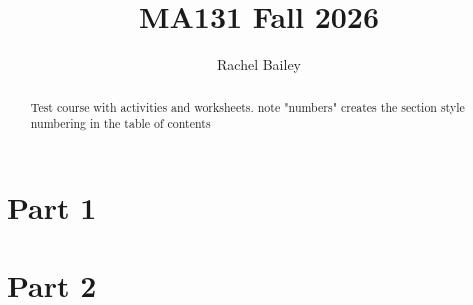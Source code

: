 \documentclass[numbers]{xourse}
\title{MA131 Fall 2026}
\author{Rachel Bailey}
\begin{document}
\begin{abstract}
 Test course with activities and worksheets. note "numbers" creates the section style numbering in the table of contents
\end{abstract}
\maketitle

\part{Part 1}
\chapterstyle
{}

\part{Part 2}
\chapterstyle
{}
\end{document}
